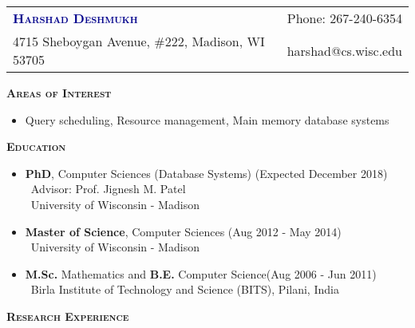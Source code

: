\documentclass[11pt]{article}
\newcommand{\graybox}[1]{\begin{mdframed}[backgroundcolor=light-gray, linecolor=light-gray, roundcorner=10pt, shadow=false, shadowsize=1pt]
\Large{\textbf{\textsc{#1}}}
\end{mdframed}}
\begin{document}
\begin{flushleft}
\begin{tabular*}{\textwidth}{@{\extracolsep{\fill}}lr}%
{\LARGE{\textcolor{darkblue}{\textbf{\textsc{Harshad Deshmukh}}}}} & Phone: 267-240-6354\\
4715 Sheboygan Avenue, \#222, Madison, WI 53705 & harshad@cs.wisc.edu
\end{tabular*}
\end{flushleft}
\graybox{Areas of Interest}
\begin{itemize}\addtolength{\itemsep}{-0.5\baselineskip}
	\item[]Query scheduling, Resource management, Main memory database systems
\end{itemize}
\graybox{Education}
\begin{itemize}\addtolength{\itemsep}{-0.5\baselineskip}
\item{\textbf{PhD}, Computer Sciences (Database Systems) \hfill (Expected December 2018) }\\
	\textendash\ Advisor: Prof. Jignesh M. Patel\\
	\textendash\ University of Wisconsin - Madison
\item{\textbf{Master of Science}, Computer Sciences \hfill (Aug 2012 - May 2014) }\\
	\textendash\ University of Wisconsin - Madison
\item{\textbf{M.Sc.} Mathematics and \textbf{B.E.} Computer Science\hfill (Aug 2006 - Jun 2011) }\\
	\textendash\ Birla Institute of Technology and Science (BITS), Pilani, India
\end{itemize}
\graybox{Research Experience}
\end{document}
